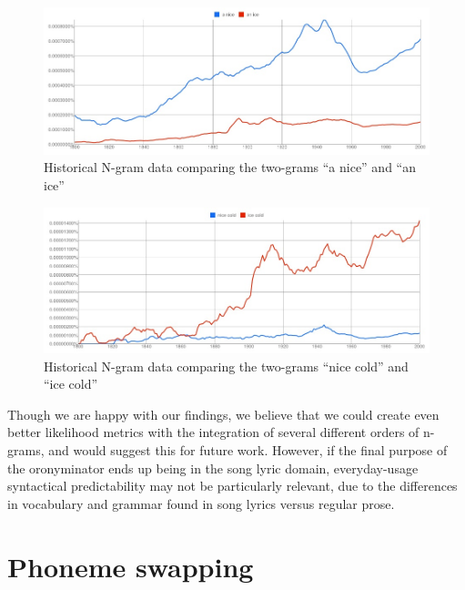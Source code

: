 \begin{figure}
\includegraphics[width=\textwidth]{googleNgram_aNiceVSanIce.jpg}
\captionfonts
\caption[Historical N-gram data comparing the two-grams ``a nice'' and ``an ice'']{Historical N-gram data comparing the two-grams ``a nice'' and ``an ice''}
\label{fig:futureWork:TwoGramAnice}
\end{figure}

\begin{figure}
\includegraphics[width=\textwidth]{googleNgram_iceColdVSniceCold.jpg}
\captionfonts
\caption[Historical N-gram data comparing the two-grams ``nice cold'' and ``ice cold'']{Historical N-gram data comparing the two-grams ``nice cold'' and ``ice cold''}
\label{fig:futureWork:TwoGramIceCold}
\end{figure}


Though we are happy with our findings, we believe that we could create even better likelihood metrics with the integration of several different orders of n-grams, and would suggest this for future work.  However, if the final purpose of the oronyminator ends up being in the song lyric domain, everyday-usage syntactical predictability may not be particularly relevant, due to the differences in vocabulary and grammar found in song lyrics versus regular prose.


\section{Phoneme swapping}
\label{section:phonemeSwapping}

